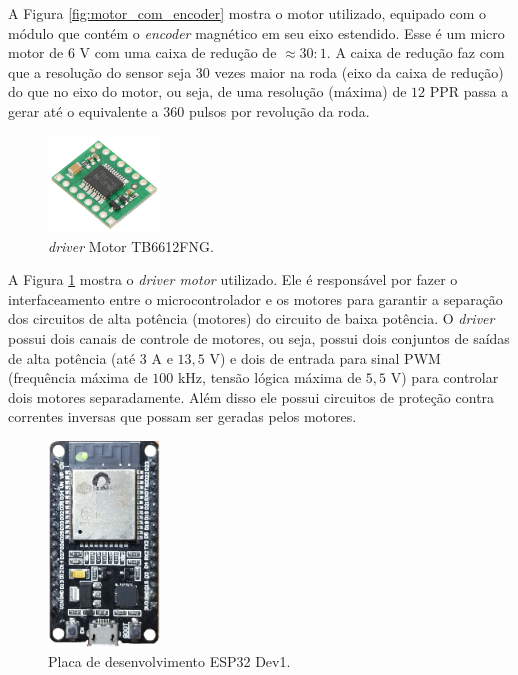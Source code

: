 A Figura \ref{fig:motor_com_encoder} mostra o motor utilizado, equipado com o módulo que contém o \textit{encoder} magnético em seu eixo estendido. Esse é um micro motor de $6$ V com uma caixa de redução de $\approx 30:1$. A caixa de redução faz com que a resolução do sensor seja $30$ vezes maior na roda (eixo da caixa de redução) do que no eixo do motor, ou seja, de uma resolução (máxima) de $12$ PPR passa a gerar até o equivalente a $360$ pulsos por revolução da roda.\\

\begin{figure}[H]
    \centering
    \includegraphics[width=3cm]{figuras/eletronica/driver.jpg}
    \caption{\textit{driver} Motor TB6612FNG.}
    \label{fig:driver_motor}
\end{figure}

A Figura \ref{fig:driver_motor} mostra o \emph{driver motor} utilizado. Ele é responsável por fazer o interfaceamento entre o microcontrolador e os motores para garantir a separação dos circuitos de alta potência (motores) do circuito de baixa potência. O \emph{driver} possui dois canais de controle de motores, ou seja, possui dois conjuntos de saídas de alta potência (até $3$ A e $13,5$ V) e dois de entrada para sinal PWM (frequência máxima de $100$ kHz, tensão lógica máxima de $5,5$ V) para controlar dois motores separadamente. Além disso ele possui circuitos de proteção contra correntes inversas que possam ser geradas pelos motores.\\


\begin{figure}[H]
    \centering
    \includegraphics[width=3cm]{figuras/eletronica/esp32_kit.png}
    \caption{Placa de desenvolvimento ESP32 Dev1.}
    \label{fig:esp32_kit}
\end{figure}


